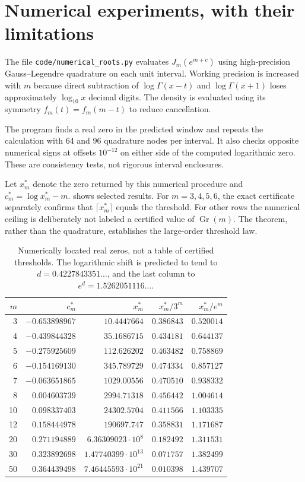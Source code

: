 \documentclass[11pt]{article}
\numberwithin{equation}{section}
\theoremstyle{definition}
\newcommand{\Gr}{\operatorname{Gr}}
\begin{document}
\section{Numerical experiments, with their limitations}\label{sec:numerical}

The file \texttt{code/numerical\_roots.py} evaluates $J_m(e^{m+c})$ using
high-precision Gauss--Legendre quadrature on each unit interval. Working
precision is increased with $m$ because direct subtraction of
$\log\Gamma(x-t)$ and $\log\Gamma(x+1)$ loses approximately $\log_{10}x$
decimal digits. The density is evaluated using its symmetry
$f_m(t)=f_m(m-t)$ to reduce cancellation.

The program finds a real zero in the predicted window and repeats the
calculation with 64 and 96 quadrature nodes per interval. It also checks
opposite numerical signs at offsets $10^{-12}$ on either side of the
computed logarithmic zero. These are consistency tests, not rigorous
interval enclosures.

Let $x_m^*$ denote the zero returned by this numerical procedure and
$c_m^*=\log x_m^*-m$.  shows selected results. For
$m=3,4,5,6$, the exact certificate separately confirms that
$\lceil x_m^*\rceil$ equals the threshold. For other rows the numerical
ceiling is deliberately not labeled a certified value of $\Gr(m)$.
The theorem, rather than the quadrature, establishes the large-order
threshold law.

\begin{table}[htbp]\centering\small
\begin{tabular}{@{}rrrrr@{}}
\toprule
$m$ & $c_m^*$ & $x_m^*$ & $x_m^*/3^m$ & $x_m^*/e^m$\\
\midrule
3 & $-0.653898967$ & $10.4447664$ & $0.386843$ & $0.520014$\\
4 & $-0.439844328$ & $35.1686715$ & $0.434181$ & $0.644137$\\
5 & $-0.275925609$ & $112.626202$ & $0.463482$ & $0.758869$\\
6 & $-0.154169130$ & $345.789729$ & $0.474334$ & $0.857127$\\
7 & $-0.063651865$ & $1029.00556$ & $0.470510$ & $0.938332$\\
8 & $0.004603739$ & $2994.71318$ & $0.456442$ & $1.004614$\\
10 & $0.098337403$ & $24302.5704$ & $0.411566$ & $1.103335$\\
12 & $0.158444978$ & $190697.747$ & $0.358831$ & $1.171687$\\
20 & $0.271194889$ & $6.36309023\cdot10^8$ & $0.182492$ & $1.311531$\\
30 & $0.323892698$ & $1.47740399\cdot10^{13}$ & $0.071757$ & $1.382499$\\
50 & $0.364439498$ & $7.46445593\cdot10^{21}$ & $0.010398$ & $1.439707$\\
\bottomrule
\end{tabular}
\caption{Numerically located real zeros, not a table of certified
thresholds. The logarithmic shift is predicted to tend to
$d=0.4227843351\ldots$, and the last column to
$e^d=1.5262051116\ldots$.}\label{tab:numerical}
\end{table}
\end{document}
